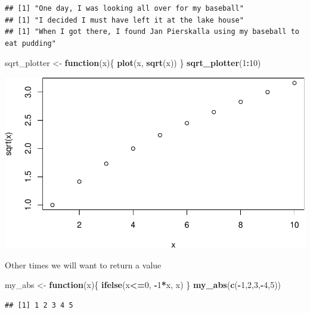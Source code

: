 \documentclass[]{article}
\newenvironment{Shaded}{\begin{snugshade}}{\end{snugshade}}
\newcommand{\KeywordTok}[1]{\textcolor[rgb]{0.13,0.29,0.53}{\textbf{#1}}}
\newcommand{\DecValTok}[1]{\textcolor[rgb]{0.00,0.00,0.81}{#1}}
\newcommand{\StringTok}[1]{\textcolor[rgb]{0.31,0.60,0.02}{#1}}
\newcommand{\ControlFlowTok}[1]{\textcolor[rgb]{0.13,0.29,0.53}{\textbf{#1}}}
\newcommand{\OperatorTok}[1]{\textcolor[rgb]{0.81,0.36,0.00}{\textbf{#1}}}
\newcommand{\NormalTok}[1]{#1}
\begin{document}
\begin{verbatim}
## [1] "One day, I was looking all over for my baseball"
## [1] "I decided I must have left it at the lake house"
## [1] "When I got there, I found Jan Pierskalla using my baseball to eat pudding"
\end{verbatim}

\begin{Shaded}
\begin{Highlighting}[]
\NormalTok{sqrt_plotter <-}\StringTok{ }\ControlFlowTok{function}\NormalTok{(x)\{}
  \KeywordTok{plot}\NormalTok{(x, }\KeywordTok{sqrt}\NormalTok{(x))}
\NormalTok{\}}
\KeywordTok{sqrt_plotter}\NormalTok{(}\DecValTok{1}\OperatorTok{:}\DecValTok{10}\NormalTok{)}
\end{Highlighting}
\end{Shaded}

\includegraphics{Lab4_Matrix_Algebra_Functions_files/figure-latex/function3-1.pdf}

Other times we will want to return a value

\begin{Shaded}
\begin{Highlighting}[]
\NormalTok{my_abs <-}\StringTok{ }\ControlFlowTok{function}\NormalTok{(x)\{}
  \KeywordTok{ifelse}\NormalTok{(x}\OperatorTok{<=}\DecValTok{0}\NormalTok{, }\OperatorTok{-}\DecValTok{1}\OperatorTok{*}\NormalTok{x, x)}
\NormalTok{\}}
\KeywordTok{my_abs}\NormalTok{(}\KeywordTok{c}\NormalTok{(}\OperatorTok{-}\DecValTok{1}\NormalTok{,}\DecValTok{2}\NormalTok{,}\DecValTok{3}\NormalTok{,}\OperatorTok{-}\DecValTok{4}\NormalTok{,}\DecValTok{5}\NormalTok{))}
\end{Highlighting}
\end{Shaded}

\begin{verbatim}
## [1] 1 2 3 4 5
\end{verbatim}
\end{document}
